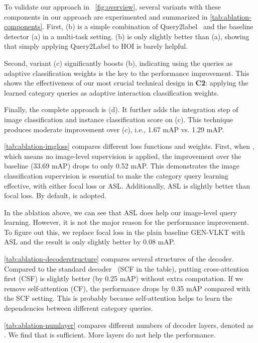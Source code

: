 \documentclass[10pt,twocolumn,letterpaper]{article}
\begin{document}
To validate our approach in ~\cref{fig:overview}, several variants with these components in our approach are experimented and summarized in \cref{tab:ablation-components}.
First, (b) is a simple combination of Query2label~\cite{liu2021query2label} and the baseline detector (a) in a multi-task setting. (b) is only slightly better than (a), showing that simply applying Query2Label to HOI is barely helpful.

Second, variant (c) significantly boosts (b), indicating using the queries as adaptive classification weights is the key to the performance improvement. This shows the effectiveness of our most crucial technical design in \textbf{C2}: applying the learned category queries as adaptive interaction classification weights.

Finally, the complete approach is (d). It further adds the integration step of image classification and instance classification score on (c). This technique produces moderate improvement over (c), i.e., 1.67 mAP vs. 1.29 mAP.

\cref{tab:ablation-imgloss} compares different loss functions and weights.
First, when , which means no image-level supervision is applied, the improvement over the baseline (33.69 mAP) drops to only 0.52 mAP. This demonstrates the image classification supervision is essential to make the category query learning effective, with either focal loss or ASL.
Additionally, ASL is slightly better than focal loss. By default,  is adopted.

In the ablation above, we can see that ASL does help our image-level query learning. However, it is not the major reason for the performance improvement. To figure out this, we replace focal loss in the plain baseline GEN-VLKT with ASL and the result is only slightly better by 0.08 mAP.

\cref{tab:ablation-decoderstructure} compares several structures of the decoder. Compared to the standard  decoder~\cite{vaswani2017attention, carion2020end} (SCF in the table), putting cross-attention first (CSF) is slightly better (by 0.25 mAP) without extra computation.
If we remove self-attention (CF), the performance drops by 0.35 mAP compared with the SCF setting. This is probably because self-attention helps to learn the dependencies between different category queries.

\cref{tab:ablation-numlayer} compares different numbers of decoder layers, denoted as . We find that  is sufficient. More layers do not help the performance.
\end{document}
